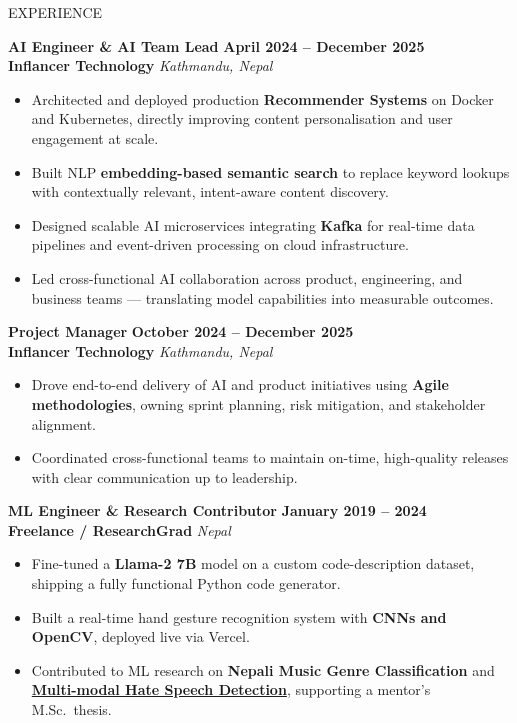 \documentclass{resume}
\begin{document}
\begin{rSection}{EXPERIENCE}

\textbf{AI Engineer \& AI Team Lead} \hfill \textbf{April 2024 – December 2025} \\
\textbf{Inflancer Technology} \hfill \textit{Kathmandu, Nepal}
\begin{itemize} \itemsep -3pt {}
    \item Architected and deployed production \textbf{Recommender Systems} on Docker and Kubernetes, directly improving content personalisation and user engagement at scale.
    \item Built NLP \textbf{embedding-based semantic search} to replace keyword lookups with contextually relevant, intent-aware content discovery.
    \item Designed scalable AI microservices integrating \textbf{Kafka} for real-time data pipelines and event-driven processing on cloud infrastructure.
    \item Led cross-functional AI collaboration across product, engineering, and business teams — translating model capabilities into measurable outcomes.
\end{itemize}

\textbf{Project Manager} \hfill \textbf{October 2024 – December 2025} \\
\textbf{Inflancer Technology} \hfill \textit{Kathmandu, Nepal}
\begin{itemize} \itemsep -3pt {}
    \item Drove end-to-end delivery of AI and product initiatives using \textbf{Agile methodologies}, owning sprint planning, risk mitigation, and stakeholder alignment.
    \item Coordinated cross-functional teams to maintain on-time, high-quality releases with clear communication up to leadership.
\end{itemize}

\textbf{ML Engineer \& Research Contributor} \hfill \textbf{January 2019 – 2024} \\
\textbf{Freelance / ResearchGrad} \hfill \textit{Nepal}
\begin{itemize} \itemsep -3pt {}
    \item Fine-tuned a \textbf{Llama-2 7B} model on a custom code-description dataset, shipping a fully functional Python code generator.
    \item Built a real-time hand gesture recognition system with \textbf{CNNs and OpenCV}, deployed live via Vercel.
    \item Contributed to ML research on \textbf{Nepali Music Genre Classification} and \href{https://github.com/abhiverse01/hatespeech-multimodal-detection}{\textbf{Multi-modal Hate Speech Detection}}, supporting a mentor's M.Sc.\ thesis.
\end{itemize}


\end{rSection}
\end{document}
